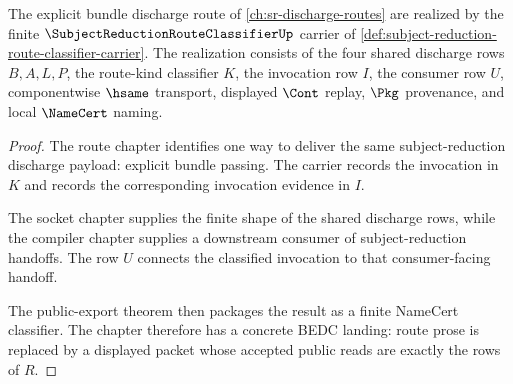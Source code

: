 \begin{theorem}
\label{thm:subject-reduction-route-classifier-vision-concretization}
The explicit bundle discharge route of \autoref{ch:sr-discharge-routes} are realized by the finite $\SubjectReductionRouteClassifierUp$ carrier of \autoref{def:subject-reduction-route-classifier-carrier}. The realization consists of the four shared discharge rows $B,A,L,P$, the route-kind classifier $K$, the invocation row $I$, the consumer row $U$, componentwise $\hsame$ transport, displayed $\Cont$ replay, $\Pkg$ provenance, and local $\NameCert$ naming.
\end{theorem}
\begin{proof}
The route chapter identifies one way to deliver the same subject-reduction discharge payload: explicit bundle passing. The carrier records the invocation in $K$ and records the corresponding invocation evidence in $I$.

The socket chapter supplies the finite shape of the shared discharge rows, while the compiler chapter supplies a downstream consumer of subject-reduction handoffs. The row $U$ connects the classified invocation to that consumer-facing handoff.

The public-export theorem then packages the result as a finite NameCert classifier. The chapter therefore has a concrete BEDC landing: route prose is replaced by a displayed packet whose accepted public reads are exactly the rows of $R$.
\end{proof}

